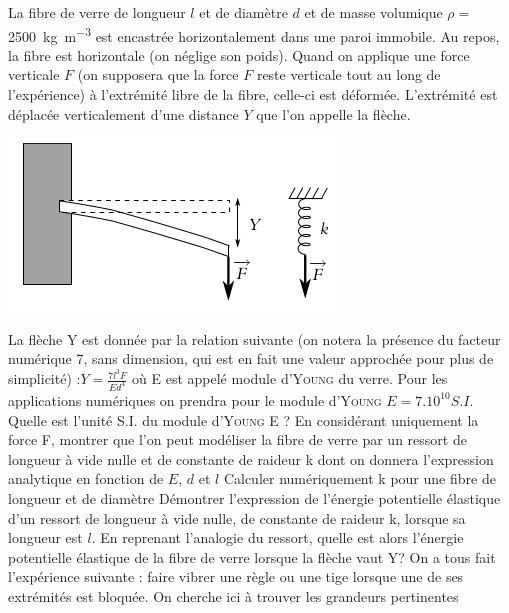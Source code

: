 \begin{Exercise}[title=($*$) Fibre de verre]
  La fibre de verre de longueur $l$ et de diamètre $d$ et de masse volumique
  $\rho=$\SI{2500}{\kg\per\m\cubed} est encastrée horizontalement dans une paroi
  immobile. Au repos, la fibre est horizontale (on néglige son poids). Quand on
  applique une force verticale $F$ (on supposera que la force $F$ reste
  verticale tout au long de l’expérience) à l’extrémité libre de la fibre,
  celle-ci est déformée. L’extrémité est déplacée verticalement d’une distance
  $Y$ que l'on appelle la flèche.
  \begin{center}
    \includegraphics[scale=0.5]{./fig/fibre_ressort.png}
  \end{center}
  La flèche Y est donnée par la relation suivante (on notera la présence du
  facteur numérique 7, sans dimension, qui est en fait une valeur approchée pour
  plus de simplicité) :$Y=\frac{7l^3F}{Ed^4}$ où E est appelé module d’\textsc{Young} du
  verre. Pour les applications numériques on prendra pour le module d’\textsc{Young}
  $E = 7.10^{10} S.I.$
  \Question Quelle est l’unité S.I. du module d’\textsc{Young} E ?
  \Question En considérant uniquement la force F, montrer que l’on peut
  modéliser la fibre de verre par un ressort de longueur à vide nulle et de
  constante de raideur k dont on donnera l’expression analytique en fonction de
  $E$, $d$ et $l$
  \Question Calculer numériquement k pour une fibre de longueur
   et de diamètre 
  \Question Démontrer l’expression de l’énergie potentielle élastique d’un ressort de longueur à
  vide nulle, de constante de raideur k, lorsque sa longueur est $l$. En
  reprenant l’analogie du ressort, quelle est alors l’énergie potentielle
  élastique de la fibre de verre lorsque la flèche vaut Y?
  \Question On a tous fait l’expérience suivante : faire vibrer une règle ou une tige lorsque une de
  ses extrémités est bloquée. On cherche ici à trouver les grandeurs pertinentes

\end{Exercise}
